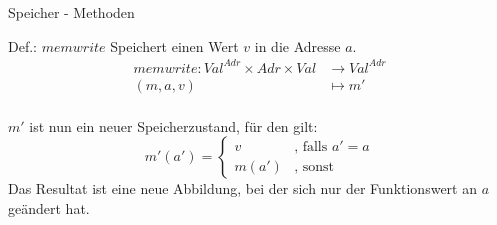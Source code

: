 \begin{frame}{Speicher - Methoden}
	\begin{block}{Def.: $memwrite$}
		Speichert einen Wert $v$ in die Adresse $a$.
		\begin{align*}
			memwrite : Val^{Adr} \times Adr \times Val &\to Val^{Adr} \\
			(m,a,v) &\mapsto m' \\
		\end{align*}

		$m'$ ist nun ein neuer Speicherzustand, für den gilt:
		\begin{equation*}
			m'(a') =
				\begin{cases}
					v & \text{, falls } a'=a \\
					m(a') & \text{, sonst}
				\end{cases}
		\end{equation*}
		Das Resultat ist eine neue Abbildung, bei der sich nur der Funktionswert an $a$ geändert hat.			
	\end{block}
\end{frame}

		
	

